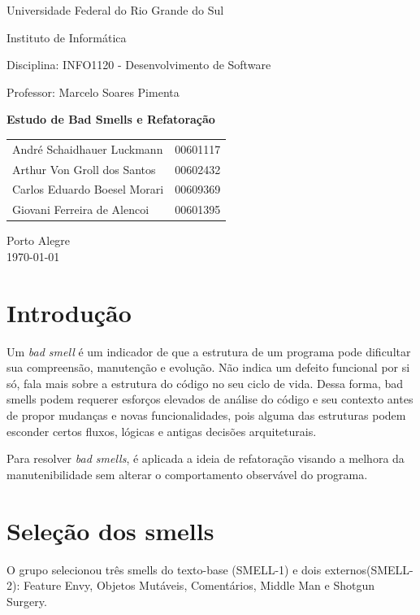 \documentclass[12pt,a4paper]{article}
\newcommand{\smell}[1]{\textit{#1}}
\begin{document}
\hypersetup{pageanchor=false}
\begin{titlepage}
  \centering
  {\large Universidade Federal do Rio Grande do Sul\par}
  {\large Instituto de Informática\par}
  \vspace{1.8cm}
  {\large Disciplina: INFO1120 - Desenvolvimento de Software\par}
  {\large Professor: Marcelo Soares Pimenta\par}
  \vfill
  {\LARGE\bfseries Estudo de Bad Smells e Refatoração\par}
  \vfill
  \begin{tabular}{ll}
    André Schaidhauer Luckmann & 00601117 \tabularnewline
    Arthur Von Groll dos Santos & 00602432 \tabularnewline
    Carlos Eduardo Boesel Morari & 00609369 \tabularnewline
    Giovani Ferreira de Alencoi & 00601395 \tabularnewline
  \end{tabular}
  \vfill
  Porto Alegre\\
  \today
\end{titlepage}

\hypersetup{pageanchor=true}


\section{Introdução}

Um \smell{bad smell} é um indicador de que a estrutura de um programa pode dificultar sua compreensão, manutenção e evolução. Não indica um defeito funcional por si só, fala mais sobre a estrutura do código no seu ciclo de vida. Dessa forma, bad smells podem requerer esforços elevados de análise do código e seu contexto antes de propor mudanças e novas funcionalidades, pois alguma das estruturas podem esconder certos fluxos, lógicas e antigas decisões arquiteturais.

Para resolver \smell{bad smells}, é aplicada a ideia de refatoração visando a melhora da manutenibilidade sem alterar o comportamento observável do programa.

\section{Seleção dos smells}

O grupo selecionou três smells do texto-base (SMELL-1) e dois externos(SMELL-2): Feature Envy, Objetos Mutáveis, Comentários, Middle Man e Shotgun Surgery.
\end{document}
